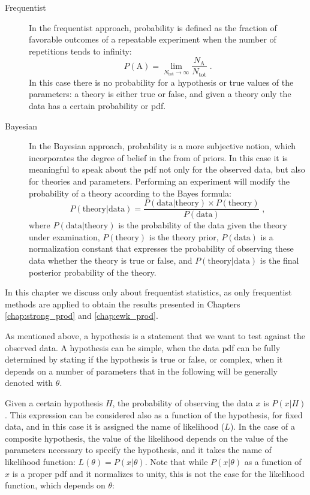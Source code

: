 \begin{description}
\item[Frequentist] In the frequentist approach, probability is defined as the fraction of favorable outcomes of a repeatable experiment when the number of repetitions tends to infinity:
\begin{equation}
P(\mathrm{A}) = \lim_{N_{\mathrm{tot}} \rightarrow \infty} \frac{N_\mathrm{A}}{N_{\mathrm{tot}}} \; .
\end{equation}
In this case there is no probability for a hypothesis or true values of the parameters: a theory is either true or false, and given a theory only the data has a certain probability or \gls{pdf}.

\item[Bayesian] In the Bayesian approach, probability is a more subjective notion, which incorporates the degree of belief in the from of priors. In this case it is meaningful to speak about the \gls{pdf} not only for the observed data, but also for theories and parameters. Performing an experiment will modify the probability of a theory according to the Bayes formula:
\begin{equation}
P(\mathrm{theory} | \mathrm{data}) = \frac{ P(\mathrm{data}|\mathrm{theory}) \times P(\mathrm{theory})}{P(\mathrm{data})} \; ,
\end{equation}
where $P(\mathrm{data}|\mathrm{theory})$ is the probability of the data given the theory under examination, $P(\mathrm{theory})$ is the theory prior, $P(\mathrm{data})$ is a normalization constant that expresses the probability of observing these data whether the theory is true or false, and $P(\mathrm{theory} | \mathrm{data})$ is the final posterior probability of the theory.

\end{description}

In this chapter we discuss only about frequentist statistics, as only frequentist methods are applied to obtain the results presented in Chapters \ref{chap:strong_prod} and \ref{chap:ewk_prod}. 

As mentioned above, a hypothesis is a statement 
that we want to test 
against the observed data. A hypothesis can be simple, when the data \gls{pdf} can be fully determined by stating if the hypothesis is true or false, or complex, when it depends on a number of parameters that in the following will be generally denoted with $\theta$. 

Given a certain hypothesis $H$, the probability of observing the data $x$ is $P(x|H)$. This expression can be considered also as a function of the hypothesis, for fixed data, and in this case it is assigned the name of likelihood ($L$). In the case of a composite hypothesis, the value of the likelihood depends on the value of the parameters necessary to specify the hypothesis, and it takes the name of likelihood function: $L(\theta)=P(x|\theta)$. 
Note that while $P(x|\theta)$ as a function of $x$ is a proper \gls{pdf} and it normalizes to unity, this is not the case for the likelihood 
function, which depends on $\theta$:

